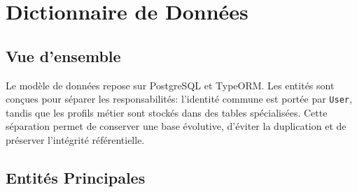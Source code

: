 \appendix
\chapter{Dictionnaire de Données}
\minitoc
\newpage

\section{Vue d'ensemble}
Le modèle de données repose sur PostgreSQL et TypeORM. Les entités sont conçues pour séparer les responsabilités: l'identité commune est portée par \texttt{User}, tandis que les profils métier sont stockés dans des tables spécialisées. Cette séparation permet de conserver une base évolutive, d'éviter la duplication et de préserver l'intégrité référentielle.

\section{Entités Principales}
